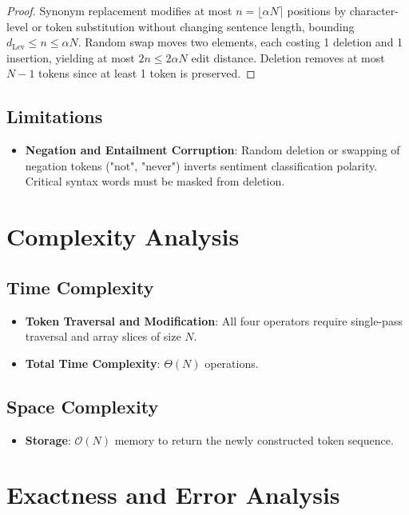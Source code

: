 \documentclass[11pt,a4paper]{article}
\theoremstyle{definition}
\begin{document}
\begin{proof}
Synonym replacement modifies at most $n = \lfloor \alpha N \rceil$ positions by character-level or token substitution without changing sentence length, bounding $d_{\text{Lev}} \le n \le \alpha N$. Random swap moves two elements, each costing 1 deletion and 1 insertion, yielding at most $2n \le 2\alpha N$ edit distance. Deletion removes at most $N-1$ tokens since at least 1 token is preserved.
\end{proof}

\subsection{Limitations}
\begin{itemize}
    \item \textbf{Negation and Entailment Corruption}: Random deletion or swapping of negation tokens ("not", "never") inverts sentiment classification polarity. Critical syntax words must be masked from deletion.
\end{itemize}

\section{Complexity Analysis}

\subsection{Time Complexity}
\begin{itemize}
    \item \textbf{Token Traversal and Modification}: All four operators require single-pass traversal and array slices of size $N$.
    \item \textbf{Total Time Complexity}: $\Theta(N)$ operations.
\end{itemize}

\subsection{Space Complexity}
\begin{itemize}
    \item \textbf{Storage}: $\mathcal{O}(N)$ memory to return the newly constructed token sequence.
\end{itemize}

\section{Exactness and Error Analysis}
\end{document}
